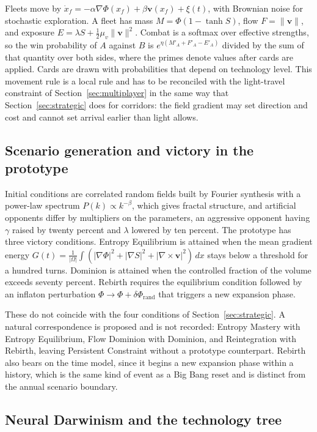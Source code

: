 \documentclass[11pt]{article}
\begin{document}
Fleets move by $\dot x_f=-\alpha\nabla\Phi(x_f)+\beta\mathbf{v}(x_f)+\xi(t)$, with Brownian noise for stochastic exploration. A fleet has mass $M=\Phi(1-\tanh S)$, flow $F=\lVert\mathbf{v}\rVert$, and exposure $E=\lambda S+\tfrac12\mu_v\lVert\mathbf{v}\rVert^2$. Combat is a softmax over effective strengths, so the win probability of $A$ against $B$ is $e^{\eta(M'_A+F'_A-E'_A)}$ divided by the sum of that quantity over both sides, where the primes denote values after cards are applied. Cards are drawn with probabilities that depend on technology level. This movement rule is a local rule and has to be reconciled with the light-travel constraint of Section~\ref{sec:multiplayer} in the same way that Section~\ref{sec:strategic} does for corridors: the field gradient may set direction and cost and cannot set arrival earlier than light allows.

\subsection{Scenario generation and victory in the prototype}

Initial conditions are correlated random fields built by Fourier synthesis with a power-law spectrum $P(k)\propto k^{-\beta}$, which gives fractal structure, and artificial opponents differ by multipliers on the parameters, an aggressive opponent having $\gamma$ raised by twenty percent and $\lambda$ lowered by ten percent. The prototype has three victory conditions. Entropy Equilibrium is attained when the mean gradient energy $G(t)=\tfrac{1}{|\Omega|}\int(|\nabla\Phi|^2+|\nabla S|^2+|\nabla\times\mathbf{v}|^2)\,dx$ stays below a threshold for a hundred turns. Dominion is attained when the controlled fraction of the volume exceeds seventy percent. Rebirth requires the equilibrium condition followed by an inflaton perturbation $\Phi\to\Phi+\delta\Phi_{\text{rand}}$ that triggers a new expansion phase.

These do not coincide with the four conditions of Section~\ref{sec:strategic}. A natural correspondence is proposed and is not recorded: Entropy Mastery with Entropy Equilibrium, Flow Dominion with Dominion, and Reintegration with Rebirth, leaving Persistent Constraint without a prototype counterpart. Rebirth also bears on the time model, since it begins a new expansion phase within a history, which is the same kind of event as a Big Bang reset and is distinct from the annual scenario boundary.

\subsection{Neural Darwinism and the technology tree}
\end{document}
